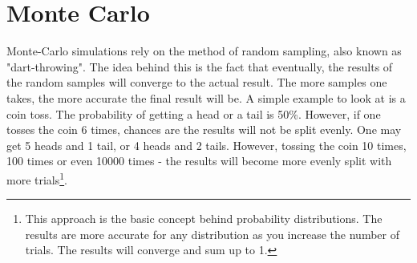 \label{sec:mcarlo}
\section{Monte Carlo}
Monte-Carlo simulations rely on the method of random sampling, also known as "dart-throwing". The idea behind this is the fact that eventually, the results of the random samples will converge to the actual result. The more samples one takes, the more accurate the final result will be. A simple example to look at is a coin toss. The probability of getting a head or a tail is 50\%. However, if one tosses the coin 6 times, chances are the results will not be split evenly. One may get 5 heads and 1 tail, or 4 heads and 2 tails. However, tossing the coin 10 times, 100 times or even 10000 times - the results will become more evenly split with more trials\footnote{This approach is the basic concept behind probability distributions. The results are more accurate for any distribution as you increase the number of trials. The results will converge and sum up to 1.}.